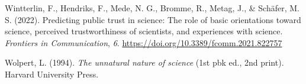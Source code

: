 \documentclass[
  jou,
  floatsintext,
  longtable,
  nolmodern,
  notxfonts,
  notimes,
  colorlinks=true,linkcolor=blue,citecolor=blue,urlcolor=blue]{apa7}
\newlength{\cslhangindent}
\newenvironment{CSLReferences}[2] %
 {\begin{list}{}{%
  \setlength{\itemindent}{0pt}
  \setlength{\leftmargin}{0pt}
  \setlength{\parsep}{0pt}
  \ifodd #1
   \setlength{\leftmargin}{\cslhangindent}
   \setlength{\itemindent}{-1\cslhangindent}
  \fi
  \setlength{\itemsep}{#2\baselineskip}}}
 {\end{list}}
\begin{document}
\begin{CSLReferences}{1}{0}
Wintterlin, F., Hendriks, F., Mede, N. G., Bromme, R., Metag, J., \&
Schäfer, M. S. (2022). Predicting public trust in science: The role of
basic orientations toward science, perceived trustworthiness of
scientists, and experiences with science. \emph{Frontiers in
Communication}, \emph{6}.
\url{https://doi.org/10.3389/fcomm.2021.822757}

Wolpert, L. (1994). \emph{The unnatural nature of science} (1st pbk ed.,
2nd print). Harvard University Press.

\end{CSLReferences}
\end{document}
